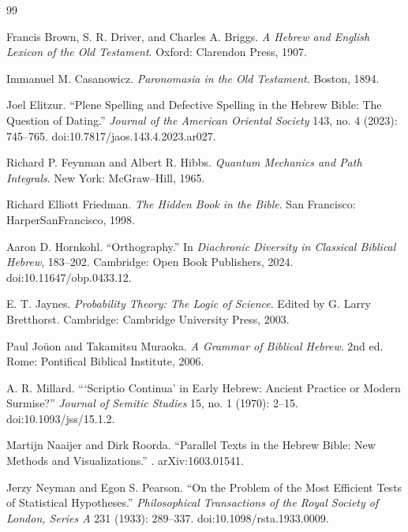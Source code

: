 \begin{thebibliography}{99}

Francis Brown, S. R. Driver, and Charles A. Briggs.
\newblock \textit{A Hebrew and English Lexicon of the Old Testament}.
\newblock Oxford: Clarendon Press, 1907.

Immanuel M. Casanowicz.
\newblock \textit{Paronomasia in the Old Testament}.
\newblock Boston, 1894.

Joel Elitzur.
\newblock ``Plene Spelling and Defective Spelling in the Hebrew Bible: The Question of Dating.''
\newblock \textit{Journal of the American Oriental Society} 143, no. 4 (2023): 745--765.
\newblock doi:10.7817/jaos.143.4.2023.ar027.

Richard P. Feynman and Albert R. Hibbs.
\newblock \textit{Quantum Mechanics and Path Integrals}.
\newblock New York: McGraw--Hill, 1965.

Richard Elliott Friedman.
\newblock \textit{The Hidden Book in the Bible}.
\newblock San Francisco: HarperSanFrancisco, 1998.

Aaron D. Hornkohl.
\newblock ``Orthography.''
\newblock In \textit{Diachronic Diversity in Classical Biblical Hebrew}, 183--202.
\newblock Cambridge: Open Book Publishers, 2024.
\newblock doi:10.11647/obp.0433.12.

E. T. Jaynes.
\newblock \textit{Probability Theory: The Logic of Science}.
\newblock Edited by G. Larry Bretthorst.
\newblock Cambridge: Cambridge University Press, 2003.

Paul Joüon and Takamitsu Muraoka.
\newblock \textit{A Grammar of Biblical Hebrew}.
\newblock 2nd ed. Rome: Pontifical Biblical Institute, 2006.

A. R. Millard.
\newblock ```Scriptio Continua' in Early Hebrew: Ancient Practice or Modern Surmise?''
\newblock \textit{Journal of Semitic Studies} 15, no. 1 (1970): 2--15.
\newblock doi:10.1093/jss/15.1.2.

Martijn Naaijer and Dirk Roorda.
\newblock ``Parallel Texts in the Hebrew Bible: New Methods and Visualizations.''
.
\newblock arXiv:1603.01541.

Jerzy Neyman and Egon S. Pearson.
\newblock ``On the Problem of the Most Efficient Tests of Statistical Hypotheses.''
\newblock \textit{Philosophical Transactions of the Royal Society of London, Series A} 231 (1933): 289--337.
\newblock doi:10.1098/rsta.1933.0009.


\end{thebibliography}
